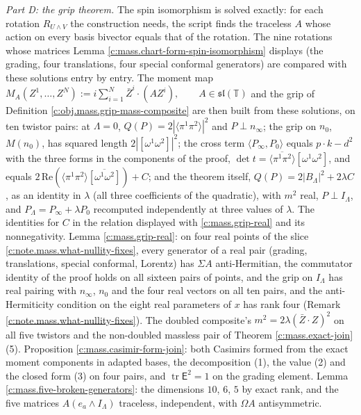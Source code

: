 \documentclass[11pt]{article}
\theoremstyle{definition}
\theoremstyle{plain}
\providecommand{\T}{}\renewcommand{\T}{\mathbb{T}}
\providecommand{\tr}{}\renewcommand{\tr}{\operatorname{tr}}
\providecommand{\br}{}\renewcommand{\br}[1]{\langle #1\rangle}
\providecommand{\ip}{}\renewcommand{\ip}[2]{\langle #1, #2\rangle}
\begin{document}
\emph{Part D: the grip theorem.} The spin isomorphism is solved exactly: for each rotation $R_{U\wedge V}$ the construction needs, the script finds the traceless $A$ whose action on every basis bivector equals that of the rotation. The nine rotations whose matrices Lemma \ref{c:mass.chart-form-spin-isomorphism} displays (the grading, four translations, four special conformal generators) are compared with these solutions entry by entry. The moment map $M_{A}(Z^{1}, \dots, Z^{N}) := i\sum_{i=1}^{N} \bar{Z}^{i}\cdot(A Z^{i}), \qquad A \in \mathfrak{sl}(\T)$ and the grip of Definition \ref{c:obj.mass.grip-mass-composite} are then built from these solutions, on ten twistor pairs: at $\Lambda = 0$, $Q(P) = 2|\br{\pi^{1}\pi^{2}}|^{2}$ and $P \perp n_{\infty}$; the grip on $n_{0}$, $M(n_{0})$, has squared length $2|[\omega^{1}\omega^{2}]|^{2}$; the cross term $\ip{P_{\infty}}{P_{0}}$ equals $p\cdot k - d^{2}$ with the three forms in the components of the proof, $\det t = \overline{\br{\pi^{1}\pi^{2}}}[\omega^{1}\omega^{2}]$, and equals $2\,\mathrm{Re}(\br{\pi^{1}\pi^{2}}\overline{[\omega^{1}\omega^{2}]}) + C$; and the theorem itself, $Q(P) = 2|B_{\Lambda}|^{2} + 2\lambda C$, as an identity in $\lambda$ (all three coefficients of the quadratic), with $m^{2}$ real, $P \perp I_{\Lambda}$, and $P_{\Lambda} = P_{\infty} + \lambda P_{0}$ recomputed independently at three values of $\lambda$. The identities for $C$ in the relation displayed with \ref{c:mass.grip-real} and its nonnegativity. Lemma \ref{c:mass.grip-real}: on four real points of the slice \ref{c:note.mass.what-nullity-fixes}, every generator of a real pair (grading, translations, special conformal, Lorentz) has $\Sigma A$ anti-Hermitian, the commutator identity of the proof holds on all sixteen pairs of points, and the grip on $I_{\Lambda}$ has real pairing with $n_{\infty}$, $n_{0}$ and the four real vectors on all ten pairs, and the anti-Hermiticity condition on the eight real parameters of $x$ has rank four (Remark \ref{c:note.mass.what-nullity-fixes}). The doubled composite's $m^{2} = 2\lambda(\bar{Z}\cdot Z)^{2}$ on all five twistors and the non-doubled massless pair of Theorem \ref{c:mass.exact-join}(5). Proposition \ref{c:mass.casimir-form-join}: both Casimirs formed from the exact moment components in adapted bases, the decomposition (1), the value (2) and the closed form (3) on four pairs, and $\tr\mathsf{E}^{2} = 1$ on the grading element. Lemma \ref{c:mass.five-broken-generators}: the dimensions $10$, $6$, $5$ by exact rank, and the five matrices $A(e_{a}\wedge I_{\Lambda})$ traceless, independent, with $\Omega A$ antisymmetric.
\end{document}
